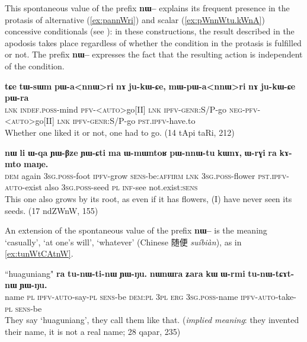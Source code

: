 \documentclass[oldfontcommands,oneside,a4paper,11pt]{article}
\newcommand{\ipa}[1]{\textbf{{\phon\mbox{#1}}}} %
\newcommand{\zh}[1]{{\cn #1}}
\begin{document}
This spontaneous value of the prefix \ipa{nɯ--}  explains its frequent presence in the protasis of alternative  (\ref{ex:pannWri}) and scalar (\ref{ex:pWnnWtu.kWnA})  concessive conditionals (see \citealt{jacques14linking}): in these constructions, the result described in the apodosis takes place regardless of whether the condition in the protasis is fulfilled or not. The prefix \ipa{nɯ--} expresses the fact that the resulting action is independent of the condition.

\begin{exe}
\ex  \label{ex:pannWri}
\gll
\ipa{tɕe}  	\ipa{tɯ-sɯm}  	\ipa{pɯ-a<nnɯ>ri}  	\ipa{nɤ}  	\ipa{ju-kɯ-ɕe,}  \ipa{mɯ-pɯ-a<nnɯ>ri}  	\ipa{nɤ}  	\ipa{ju-kɯ-ɕe}  	\ipa{pɯ-ra}  \\
\textsc{lnk} \textsc{indef.poss}-mind  \textsc{pfv-<auto>}go[II] \textsc{lnk} \textsc{ipfv-genr}:S/P-go \textsc{neg-pfv-<auto>}go[II] \textsc{lnk} \textsc{ipfv-genr}:S/P-go \textsc{pst.ipfv}-have.to \\
\glt Whether one liked it or not, one had to go. (14 tApi taRi, 212)
\end{exe}


 \begin{exe}
\ex  \label{ex:pWnnWtu.kWnA}
\gll
\ipa{nɯ}    	\ipa{li}    	\ipa{ɯ-qa}    	\ipa{ɲɯ-βze}    	\ipa{ɲɯ-ɕti}    	\ipa{ma}    	\ipa{ɯ-mɯntoʁ}    	\ipa{pɯ-nnɯ-tu}    	\ipa{kɯnɤ,}    	\ipa{ɯ-rɣi}    	\ipa{ra}    	\ipa{kɤ-mto}    	\ipa{maŋe.}    \\
\textsc{dem} again \textsc{3sg.poss}-foot \textsc{ipfv}-grow \textsc{sens}-be:\textsc{affirm} \textsc{lnk} \textsc{3sg.poss}-flower \textsc{pst.ipfv-auto}-exist also \textsc{3sg.poss}-seed \textsc{pl} \textsc{inf}-see not.exist:\textsc{sens} \\
\glt This one also grows by its root, as even if it has flowers, (I) have never seen its seeds. (17 ndZWnW, 155)
\end{exe}


An extension of the spontaneous value of the prefix \ipa{nɯ--} is the meaning `casually', `at one's will', `whatever' (Chinese \zh{随便} \textit{suíbiàn}), as in \ref{ex:tunWtCAtnW}. 

\begin{exe}
\ex \label{ex:tunWtCAtnW}
\gll
``huaguniang" \ipa{ra}  	\ipa{tu-nɯ-ti-nɯ}  	\ipa{ɲɯ-ŋu.}  	\ipa{nɯnɯra}  	\ipa{ʑara}  	\ipa{kɯ}  	\ipa{ɯ-rmi}  	\ipa{tu-nɯ-tɕɤt-nɯ}  	\ipa{ɲɯ-ŋu.}  \\
name \textsc{pl}	\textsc{ipfv-auto}-say-\textsc{pl}	\textsc{sens}-be	\textsc{dem:pl}	\textsc{3pl}	\textsc{erg}	\textsc{3sg.poss}-name	\textsc{ipfv-auto}-take-\textsc{pl}	\textsc{sens}-be\\
\glt They say `huaguniang', they call them like that. (\textit{implied meaning}: they invented their name, it is not a real name; 28 qapar, 235)
\end{exe}
\end{document}
